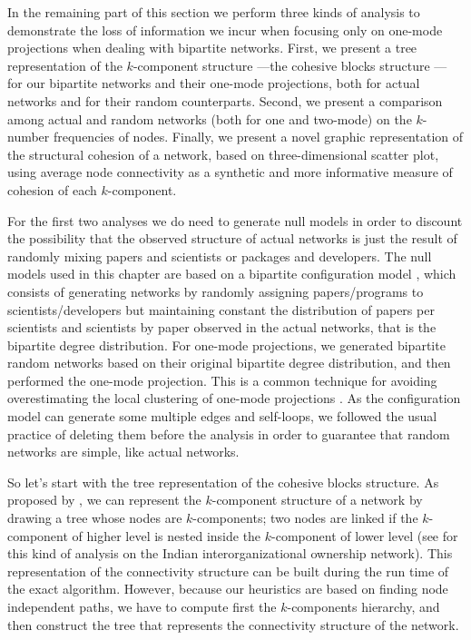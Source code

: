 In the remaining part of this section we perform three kinds of analysis to demonstrate the loss of information we incur when focusing only on one-mode projections when dealing with bipartite networks. First, we present a tree representation of the $k$-component structure ---the cohesive blocks structure \citep{white:2001,moody:2003,white:2004,mani:2014}--- for our bipartite networks and their one-mode projections, both for actual networks and for their random counterparts. Second, we present a comparison among actual and random networks (both for one and two-mode) on the $k$-number frequencies of nodes. Finally, we present a novel graphic representation of the structural cohesion of a network, based on three-dimensional scatter plot, using average node connectivity as a synthetic and more informative measure of cohesion of each $k$-component.

For the first two analyses we do need to generate null models in order to discount the possibility that the observed structure of actual networks is just the result of randomly mixing papers and scientists or packages and developers. The null models used in this chapter are based on a bipartite configuration model \citep{newman:2003}, which consists of generating networks by randomly assigning papers/programs to scientists/developers but maintaining constant the distribution of papers per scientists and scientists by paper observed in the actual networks, that is the bipartite degree distribution. For one-mode projections, we generated bipartite random networks based on their original bipartite degree distribution, and then performed the one-mode projection. This is a common technique for avoiding overestimating the local clustering of one-mode projections \citep{uzzi:2007}. As the configuration model can generate some multiple edges and self-loops, we followed the usual practice of deleting them before the analysis in order to guarantee that random networks are simple, like actual networks.

So let's start with the tree representation of the cohesive blocks structure. As proposed by \citet{white:2004}, we can represent the $k$-component structure of a network by drawing a tree whose nodes are $k$-components; two nodes are linked if the $k$-component of higher level is nested inside the $k$-component of lower level (see \citet[1643,1651]{mani:2014} for this kind of analysis on the Indian interorganizational ownership network). This representation of the connectivity structure can be built during the run time of the exact algorithm. However, because our heuristics are based on finding node independent paths, we have to compute first the $k$-components hierarchy, and then construct the tree that represents the connectivity structure of the network.

